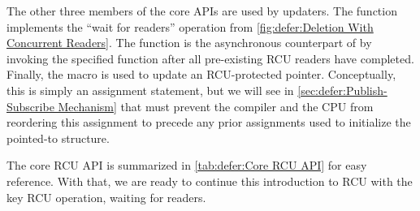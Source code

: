 The other three members of the core APIs are used by updaters.
The  function implements the ``wait for readers''
operation from \cref{fig:defer:Deletion With Concurrent Readers}.
The  function is the asynchronous counterpart of
 by invoking the specified function after
all pre-existing RCU readers have completed.
Finally, the  macro is used to update an
RCU-protected pointer.
Conceptually, this is simply an assignment statement, but we will
see in
\cref{sec:defer:Publish-Subscribe Mechanism}
that  must prevent the compiler and the CPU
from reordering this assignment to precede any prior assignments used
to initialize the pointed-to structure.

\begin{table*}
\renewcommand*{\arraystretch}{1.25}
\small
\centering
{}
\caption{Core RCU API}
\label{tab:defer:Core RCU API}
\end{table*}

\QuickQuizEnd

The core RCU API is summarized in \cref{tab:defer:Core RCU API} for
easy reference.
With that, we are ready to continue this introduction to RCU with
the key RCU operation, waiting for readers.

